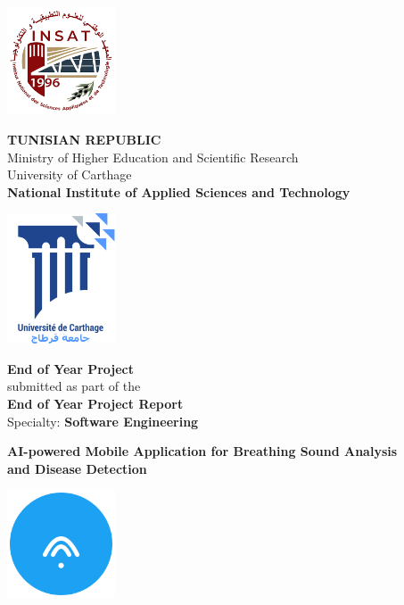 \begin{minipage}{0.25\textwidth}
  \includegraphics[width=3.2cm]{insat_logo.png}
\end{minipage}
\begin{minipage}{0.5\textwidth}
  \centering
  \textbf{TUNISIAN REPUBLIC} \\
  Ministry of Higher Education and Scientific Research \\
  University of Carthage \\
  \textbf{National Institute of Applied Sciences and Technology}
\end{minipage}
\begin{minipage}{0.25\textwidth}
  \raggedleft
  \includegraphics[width=3.2cm]{ucar_logo.png}
\end{minipage}

\vspace{0.6cm} %

\begin{center}
  \Large\textbf{End of Year Project} \\[0.25cm]
  \normalsize submitted as part of the \\
  \textbf{End of Year Project Report} \\
  Specialty: \textbf{Software Engineering}
\end{center}

\vspace{0.6cm} %

\begin{center}
  \textbf{\large AI-powered Mobile Application for Breathing Sound Analysis \\ and Disease Detection}
  
  \vspace{0.5cm} %
  \includegraphics[width=3.2cm]{images/UI_Screenshots/logo_filled.png} %
\end{center}

